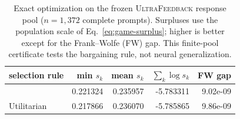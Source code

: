 \begin{table}[t]
\centering\footnotesize
\setlength{\tabcolsep}{4.5pt}
\caption{Exact optimization on the frozen \textsc{UltraFeedback} response pool ($n=1{,}372$ complete prompts). Surpluses use the population scale of Eq.~\eqref{eq:game-surplus}; higher is better except for the Frank--Wolfe (FW) gap. This finite-pool certificate tests the bargaining rule, not neural generalization.}
\label{tab:finite-pool-certificate}
\begin{tabular}{lrrrr}
\toprule
selection rule & min $s_k$ & mean $s_k$ & $\sum_k\log s_k$ & FW gap \\
\midrule
\NBPO{} & 0.221324 & 0.235957 & -5.783311 & 9.02e-09 \\
Utilitarian & 0.217866 & 0.236070 & -5.785865 & 9.86e-09 \\
\bottomrule
\end{tabular}
\end{table}
